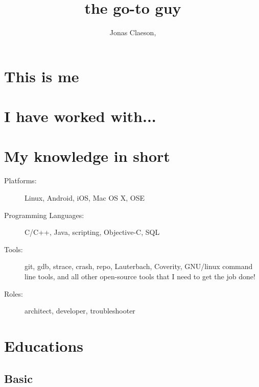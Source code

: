 \documentclass[ DIV=calc,%
                paper=a4,%
                fontsize=11pt,%
                twocolumn]{scrartcl}
\title{the go-to guy}
\author{Jonas Claeson, }
\date{}
\begin{document}
\maketitle
\thispagestyle{fancy}


\section*{This is me}



\section*{I have worked with...}

\begin{description}











\end{description}

\section*{My knowledge in short}

\begin{description}
    \item[Platforms:] Linux, Android, iOS, Mac OS X, OSE
    \item[Programming Languages:] C/C++, Java, scripting, Objective-C, SQL
    \item[Tools:] git, gdb, strace, crash, repo, Lauterbach, Coverity, GNU/linux command line tools, and all other open-source tools that I need to get the job done!
    \item[Roles:] architect, developer, troubleshooter
\end{description}

\section*{Educations}

\subsection*{Basic}
\end{document}
